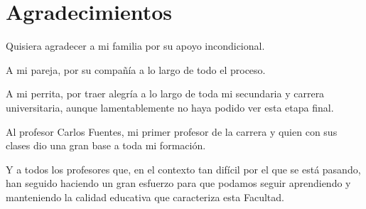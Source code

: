 \chapter*{Agradecimientos}

\noindent Quisiera agradecer a mi familia por su apoyo incondicional.

\noindent A mi pareja, por su compañía a lo largo de todo el proceso.

\noindent A mi perrita, por traer alegría a lo largo de toda mi secundaria y carrera universitaria, aunque lamentablemente no haya podido ver esta etapa final. 

\noindent Al profesor Carlos Fuentes, mi primer profesor de la carrera y quien con sus clases dio una gran base a toda mi formación.

\noindent Y a todos los profesores que, en el contexto tan difícil por el que se está pasando, han seguido haciendo un gran esfuerzo para que podamos seguir aprendiendo y manteniendo la calidad educativa que caracteriza esta Facultad.